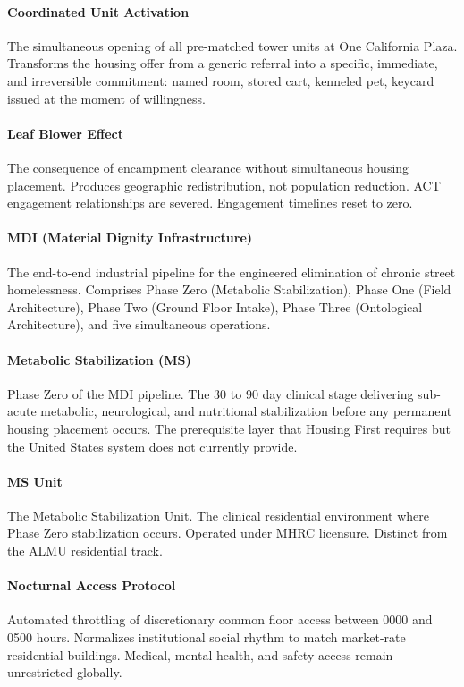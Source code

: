 {\paragraph{Coordinated Unit Activation} The simultaneous opening of all pre-matched tower units at One California Plaza. Transforms the housing offer from a generic referral into a specific, immediate, and irreversible commitment: named room, stored cart, kenneled pet, keycard issued at the moment of willingness.

\paragraph{Leaf Blower Effect} The consequence of encampment clearance without simultaneous housing placement. Produces geographic redistribution, not population reduction. ACT engagement relationships are severed. Engagement timelines reset to zero.

\paragraph{MDI (Material Dignity Infrastructure)} The end-to-end industrial pipeline for the engineered elimination of chronic street homelessness. Comprises Phase Zero (Metabolic Stabilization), Phase One (Field Architecture), Phase Two (Ground Floor Intake), Phase Three (Ontological Architecture), and five simultaneous operations.

\paragraph{Metabolic Stabilization (MS)} Phase Zero of the MDI pipeline. The 30 to 90 day clinical stage delivering sub-acute metabolic, neurological, and nutritional stabilization before any permanent housing placement occurs. The prerequisite layer that Housing First requires but the United States system does not currently provide.

\paragraph{MS Unit} The Metabolic Stabilization Unit. The clinical residential environment where Phase Zero stabilization occurs. Operated under MHRC licensure. Distinct from the ALMU residential track.

\paragraph{Nocturnal Access Protocol} Automated throttling of discretionary common floor access between 0000 and 0500 hours. Normalizes institutional social rhythm to match market-rate residential buildings. Medical, mental health, and safety access remain unrestricted globally.

}
